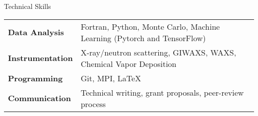 
\begin{rubric}{Technical Skills}
\begin{tabular}{@{}ll@{}}
\textbf{Data Analysis} & Fortran, Python, Monte Carlo, Machine Learning (Pytorch and TensorFlow) \\
\textbf{Instrumentation} & X-ray/neutron scattering, GIWAXS, WAXS, Chemical Vapor Deposition\\
\textbf{Programming} & Git, MPI, LaTeX\\
\textbf{Communication} & Technical writing, grant proposals, peer-review process\\
\end{tabular}
\end{rubric}
